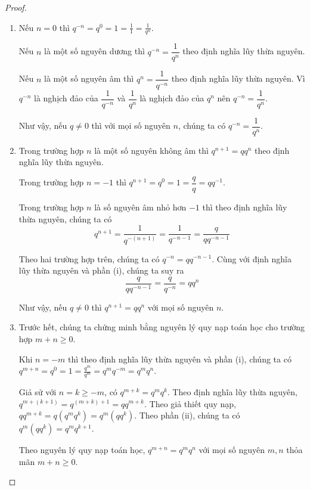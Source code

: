 \begin{proof}
    \begin{enumerate}[label={(\roman*)}]
        \item Nếu $n = 0$ thì $q^{-n} = q^{0} = 1 = \frac{1}{1} = \frac{1}{q^{n}}$.

              Nếu $n$ là một số nguyên dương thì $q^{-n} = \dfrac{1}{q^{n}}$ theo định nghĩa lũy thừa nguyên.

              Nếu $n$ là một số nguyên âm thì $q^{n} = \dfrac{1}{q^{-n}}$ theo định nghĩa lũy thừa nguyên. Vì $q^{-n}$ là nghịch đảo của $\dfrac{1}{q^{-n}}$ và $\dfrac{1}{q^{n}}$ là nghịch đảo của $q^{n}$ nên $q^{-n} = \dfrac{1}{q^{n}}$.

              Như vậy, nếu $q\ne 0$ thì với mọi số nguyên $n$, chúng ta có $q^{-n} = \dfrac{1}{q^{n}}$.
        \item Trong trường hợp $n$ là một số nguyên không âm thì $q^{n+1} = qq^{n}$ theo định nghĩa lũy thừa nguyên.

              Trong trường hợp $n = -1$ thì $q^{n+1} = q^{0} = 1 = \dfrac{q}{q} = qq^{-1}$.

              Trong trường hợp $n$ là số nguyên âm nhỏ hơn $-1$ thì theo định nghĩa lũy thừa nguyên, chúng ta có
              \[
                  q^{n+1} = \dfrac{1}{q^{-(n+1)}} = \dfrac{1}{q^{-n-1}} = \dfrac{q}{qq^{-n-1}}
              \]

              Theo hai trường hợp trên, chúng ta có $q^{-n} = qq^{-n-1}$. Cùng với định nghĩa lũy thừa nguyên và phần (i), chúng ta suy ra
              \[
                  \dfrac{q}{qq^{-n-1}} = \dfrac{q}{q^{-n}} = qq^{n}
              \]

              Như vậy, nếu $q\ne 0$ thì $q^{n+1} = qq^{n}$ với mọi số nguyên $n$.
        \item Trước hết, chúng ta chứng minh bằng nguyên lý quy nạp toán học cho trường hợp $m + n\geq 0$.

              Khi $n = -m$ thì theo định nghĩa lũy thừa nguyên và phần (i), chúng ta có $q^{m + n} = q^{0} = 1 = \frac{q^{m}}{q^{m}} = q^{m}q^{-m} = q^{m}q^{n}$.

              Giả sử với $n = k\geq -m$, có $q^{m+k} = q^{m}q^{k}$. Theo định nghĩa lũy thừa nguyên, $q^{m+(k+1)} = q^{(m+k)+1} = qq^{m+k}$. Theo giả thiết quy nạp, $qq^{m+k} = q(q^{m}q^{k}) = q^{m}(qq^{k})$. Theo phần (ii), chúng ta có $q^{m}(qq^{k}) = q^{m}q^{k+1}$.

              Theo nguyên lý quy nạp toán học, $q^{m + n} = q^{m}q^{n}$ với mọi số nguyên $m, n$ thỏa mãn $m+n\geq 0$.


\end{enumerate}
\end{proof}
